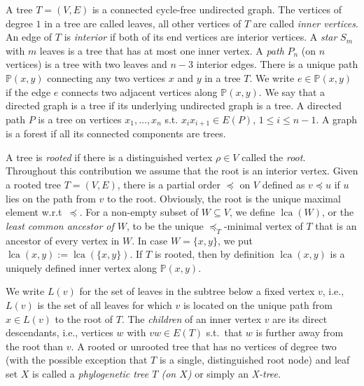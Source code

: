 \documentclass[smallextended]{svjour3}
\newcommand{\rev}[1]{\begingroup\color{blue}#1\endgroup}
\newcommand{\lca}[1]{\mathop{lca}(#1)}
\begin{document}
A tree $T=(V,E)$ is a connected cycle-free undirected graph.  The vertices
of degree $1$ in a tree are called leaves, all other vertices of $T$ are
called \emph{inner vertices}. An edge of $T$ is \emph{interior} if both of
its end vertices are interior vertices. A \emph{star} $S_m$ with $m$ leaves
is a tree that has at most one inner vertex. A \emph{path} $P_n$ (on $n$
vertices) is a tree with two leaves and $n-3$ interior edges.  There is a
unique path $\mathbb{P}(x,y)$ connecting any two vertices $x$ and $y$ in a
tree $T$. We write $e\in\mathbb{P}(x,y)$ if the edge $e$ connects two
adjacent vertices along $\mathbb{P}(x,y)$.  We say that a directed graph is
a tree if its underlying undirected graph is a tree.  A directed path $P$
is a tree on vertices $x_1,\dots,x_n$ s.t. $x_ix_{i+1}\in E(P)$, $1\leq
i\leq n-1$. A graph is a forest if all its connected components are trees.

A tree is \emph{rooted} if there is a distinguished vertex $\rho\in V$
called the \emph{root}. Throughout this contribution we assume that the
root is an interior vertex. \rev{  Given a rooted tree $T=(V,E)$, there is a partial
order $\preceq$ on $V$ defined as  $ v \preceq u$ if 
$u$ lies on the path from $v$ to the root. Obviously,
the root is the unique maximal element w.r.t\ $\preceq$.
For a non-empty subset of $W\subseteq V$, we define $\lca{W}$, or
the \emph{least common ancestor of $W$}, to be the unique
$\preceq_T$-minimal vertex of $T$ that is an ancestor of every vertex in
$W$. In case $W=\{x,y \}$, we put $\lca{x,y}:=\lca{\{x,y\}}$.}
If $T$ is rooted, then by definition $\lca{x,y}$ is a uniquely defined
inner vertex along $\mathbb{P}(x,y)$.

We write $L(v)$ for the set of leaves in the subtree below a fixed vertex
$v$, i.e., $L(v)$ is the set of all leaves for which $v$ is located on the
unique path from $x\in L(v)$ to the root of $T$. The \emph{children} of an
inner vertex $v$ are its direct descendants, i.e., vertices $w$ with $vw\in
E(T)$ s.t.\ that $w$ is further away from the root than $v$.  A rooted or
unrooted tree that has no vertices of degree two (with the possible
exception that $T$ is a single, distinguished root node) and leaf set $X$
is called a \emph{phylogenetic tree $T$ (on $X$)} or simply an
\emph{X-tree}.
\end{document}
